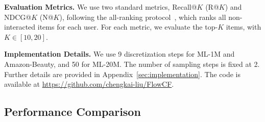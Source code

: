 \documentclass[sigconf]{acmart}
\begin{document}
\vspace{3pt}
\noindent \textbf{Evaluation Metrics.} We use two standard metrics, Recall@$K$ (R@$K$) and NDCG@$K$ (N@$K$), following the all-ranking protocol~\cite{he2020lightgcn}, which ranks all non-interacted items for each user. For each metric, we evaluate the top-$K$ items, with $K \in [10, 20]$.

\vspace{3pt}
\noindent \textbf{Implementation Details.} We use 9 discretization steps for ML-1M and Amazon-Beauty, and 50 for ML-20M. The number of sampling steps is fixed at 2. Further details are provided in Appendix~\ref{sec:implementation}. The code is available at \url{https://github.com/chengkai-liu/FlowCF}.

\subsection{Performance Comparison}
\end{document}
